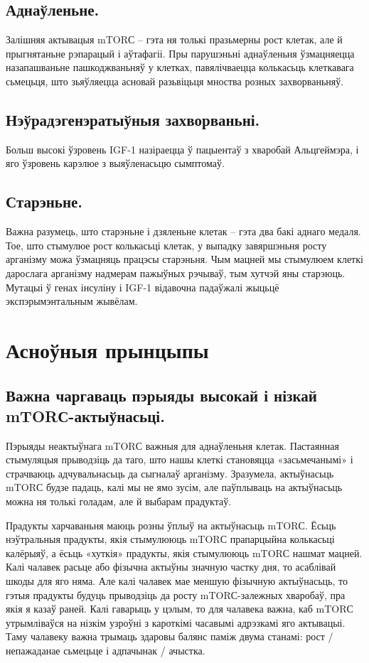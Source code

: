 \subsection{Аднаўленьне.}
Залішняя актывацыя mTORС – гэта ня толькі празьмерны рост клетак, але й прыгнятаньне рэпарацый і аўтафагіі. Пры парушэньні аднаўленьня ўзмацняецца назапашваньне пашкоджваньняў у клетках, павялічваецца колькасьць клеткавага сьмецьця, што зьяўляецца асновай разьвіцьця мноства розных захворваньняў.

\subsection{Нэўрадэгенэратыўныя захворваньні.}
Больш высокі ўзровень IGF-1 назіраецца ў пацыентаў з хваробай Альцгеймэра, і яго ўзровень карэлюе з выяўленасьцю сымптомаў.

\subsection{Старэньне.}
Важна разумець, што старэньне і дзяленьне клетак – гэта два бакі аднаго медаля. Тое, што стымулюе рост колькасьці клетак, у выпадку завяршэньня росту арганізму можа ўзмацняць працэсы старэньня. Чым мацней мы стымулюем клеткі дарослага арганізму надмерам пажыўных рэчываў, тым хутчэй яны старэюць. Мутацыі ў генах інсуліну і IGF-1 відавочна падаўжалі жыцьцё экспэрымэнтальным жывёлам.

\section{Асноўныя прынцыпы}

\subsection{Важна чаргаваць пэрыяды высокай і нізкай mTORС-актыўнасьці.}
Пэрыяды неактыўнага mTORС важныя для аднаўленьня клетак. Пастаянная стымуляцыя прыводзіць да таго, што нашы клеткі становяцца «засьмечанымі» і страчваюць адчувальнасьць да сыгналаў арганізму. Зразумела, актыўнасьць mTORС будзе падаць, калі мы не ямо зусім, але паўплываць на актыўнасьць можна ня толькі голадам, але й выбарам прадуктаў.

Прадукты харчаваньня маюць розны ўплыў на актыўнасьць mTORС. Ёсьць нэўтральныя прадукты, якія стымулююць mTORС прапарцыйна колькасьці калёрыяў, а ёсьць «хуткія» прадукты, якія стымулююць mTORС нашмат мацней. Калі чалавек расьце або фізычна актыўны значную частку дня, то асаблівай шкоды для яго няма. Але калі чалавек мае меншую фізычную актыўнасьць, то гэтыя прадукты будуць прыводзіць да росту mTORС-залежных хваробаў, пра якія я казаў раней. Калі гаварыць у цэлым, то для чалавека важна, каб mTORС утрымліваўся на нізкім узроўні з кароткімі часавымі адрэзкамі яго актывацыі. Таму чалавеку важна трымаць здаровы балянс паміж двума станамі: рост / непажаданае сьмецьце і адпачынак / ачыстка.

